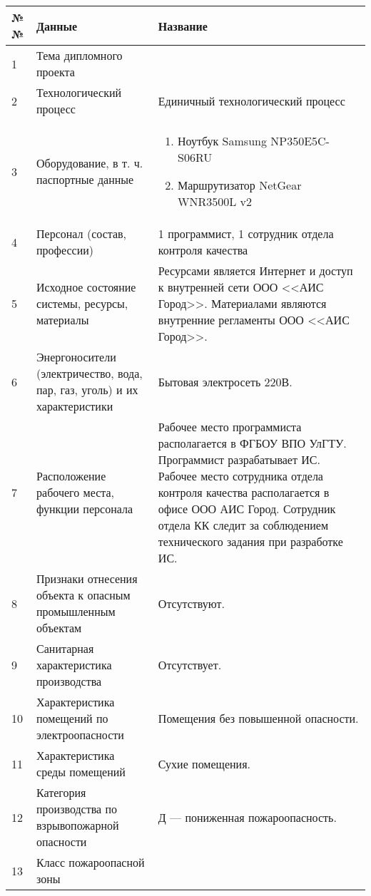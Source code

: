 \begin{footnotesize}
\begin{longtable}[h]{|p{}|p{}|p{}|}

	\hline
		\textbf{№№} &
		\textbf{Данные} &
		\textbf{Название} \\
	\hline
		1 & 
		Тема дипломного проекта &
		\WorkName \\
	\hline
		2 & 
		Технологический процесс &
		Единичный технологический процесс \\
	\hline
		3 & 
		Оборудование, в т. ч. паспортные данные &
		\begin{enumerate}
			\item Ноутбук Samsung NP350E5C-S06RU 
			\item Маршрутизатор NetGear WNR3500L v2
		\end{enumerate} \\
	\hline
		4 & 
		Персонал (состав, профессии) &
		1 программист, 1 сотрудник отдела контроля качества \\
	\hline
		5 & 
		Исходное состояние системы, ресурсы, материалы &
		Ресурсами является Интернет и доступ к внутренней сети ООО <<АИС Город>>.
		Материалами являются внутренние регламенты ООО <<АИС Город>>.\\
	\hline
		6 & 
		Энергоносители (электричество, вода, пар, газ, уголь) и их характеристики &
		Бытовая электросеть 220В. \\
	\hline
		7 & 
		Расположение рабочего места, функции персонала &
		Рабочее место программиста располагается в ФГБОУ ВПО УлГТУ.
		Программист разрабатывает ИС. \newline
		Рабочее место сотрудника отдела контроля качества располагается в офисе ООО АИС Город.
		Сотрудник отдела КК следит за соблюдением технического задания при разработке ИС. \\
	\hline
		8 & 
		Признаки отнесения объекта к опасным промышленным объектам &
		Отсутствуют. \\
	\hline
		9 & 
		Санитарная характеристика производства &
		Отсутствует. \\
	\hline
		10 & 
		Характеристика помещений по электроопасности &
		Помещения без повышенной опасности. \\
	\hline
		11 & 
		Характеристика среды помещений &
		Сухие помещения. \\
	\hline
		12 & 
		Категория производства по взрывопожарной опасности &
		Д --- пониженная пожароопасность. \\
	\hline
		13 & 
		Класс пожароопасной зоны &

\end{longtable}
\end{footnotesize}
